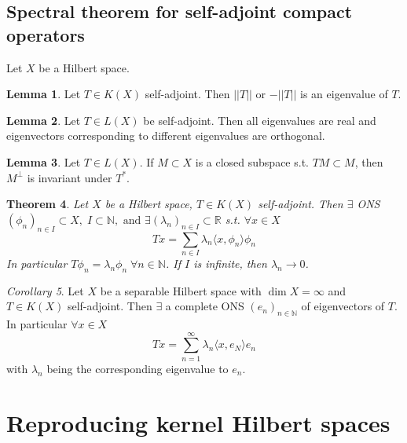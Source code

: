 \documentclass[a4paper, 12pt]{article}
\theoremstyle{plain}
\newtheorem{theorem}{Theorem}[subsection] %
\theoremstyle{definition}
\theoremstyle{lemma}
\newtheorem{lemma}[theorem]{Lemma}
\theoremstyle{remark}
\theoremstyle{corollary}
\newtheorem{corollary}[theorem]{Corollary}
\theoremstyle{example}
\begin{document}
	\subsection{Spectral theorem for self-adjoint compact operators}
	Let $X$ be a Hilbert space.
	\begin{lemma}
		Let $T \in K(X)$ self-adjoint. Then $||T||$ or $-||T||$ is an eigenvalue of $T$. 
	\end{lemma}
	\begin{lemma}
		Let $T \in L(X)$ be self-adjoint. Then all eigenvalues are real and eigenvectors corresponding to different eigenvalues are orthogonal.
	\end{lemma}
	\begin{lemma}
		Let $T \in L(X)$. If $M \subset X$ is a closed subspace s.t. $TM\subset M$, then $M^\bot$ is invariant under $T^*$.
	\end{lemma}
	\begin{theorem}
		Let $X$ be a Hilbert space, $T\in K(X)$ self-adjoint. Then $\exists$ ONS $ (\phi_n)_{n \in I} \subset X, \; I\subset \mathbb{N}, \text{ and } \exists (\lambda_n)_{n \in I} \subset \mathbb{R}$ s.t. $\forall x \in X$ \[Tx = \sum_{n \in I} \lambda_n \langle x, \phi_n\rangle \phi_n\] In particular $T\phi_n = \lambda_n \phi_n \; \forall n \in \mathbb{N}$. If $I$ is infinite, then $\lambda_n \to 0$.
	\end{theorem}
	\begin{corollary}
		Let $X$ be a separable Hilbert space with $\dim X = \infty$ and $T \in K(X)$ self-adjoint. Then $\exists$ a complete ONS $(e_n)_{n \in \mathbb{N}}$ of eigenvectors of $T$. In particular $\forall x \in X$ \[Tx = \sum_{n=1}^\infty \lambda_n \langle x,e_N\rangle e_n\]
		with $\lambda_n$ being the corresponding eigenvalue to $e_n$.
	\end{corollary}
\section{Reproducing kernel Hilbert spaces}
\end{document}
